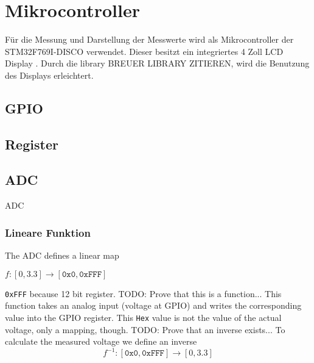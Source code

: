 \section{Mikrocontroller}

Für die Messung und Darstellung der Messwerte wird als Mikrocontroller der STM32F769I-DISCO verwendet. \newline
Dieser besitzt ein integriertes 4 Zoll LCD Display \cite{MikroControllerDatasheet}.
Durch die library BREUER LIBRARY ZITIEREN, wird die Benutzung des Displays erleichtert.

\subsection{GPIO}


\subsection{Register}


\subsection{ADC}

ADC

\subsubsection{Lineare Funktion}
The ADC defines a linear map
\begin{center}
	$f: [0,3.3] \rightarrow [\texttt{0x0}, \texttt{0xFFF}]$
\end{center}
\texttt{0xFFF} because 12 bit register. \newline
TODO: Prove that this is a function... \newline
This function takes an analog input (voltage at GPIO) and writes the corresponding value into the GPIO register. \newline
This \texttt{Hex} value is not the value of the actual voltage, only a mapping, though.
TODO: Prove that an inverse exists... \newline
To calculate the measured voltage we define an inverse
$$
	f^{-1}: [\texttt{0x0}, \texttt{0xFFF}] \rightarrow [0, 3.3]
$$
